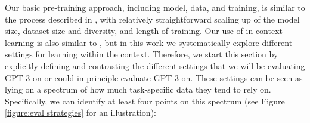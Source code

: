 \documentclass{article}
\begin{document}
Our basic pre-training approach, including model, data, and training, is similar to the process described in \cite{radford2019language}, with relatively straightforward scaling up of the model size, dataset size and diversity, and length of training.  Our use of in-context learning is also similar to \cite{radford2019language}, but in this work we systematically explore different settings for learning within the context.  Therefore, we start this section by explicitly defining and contrasting the different settings that we will be evaluating GPT-3 on or could in principle evaluate GPT-3 on. These settings can be seen as lying on a spectrum of how much task-specific data they tend to rely on.  Specifically, we can identify at least four points on this spectrum (see Figure \ref{figure:eval strategies} for an illustration):
\end{document}
